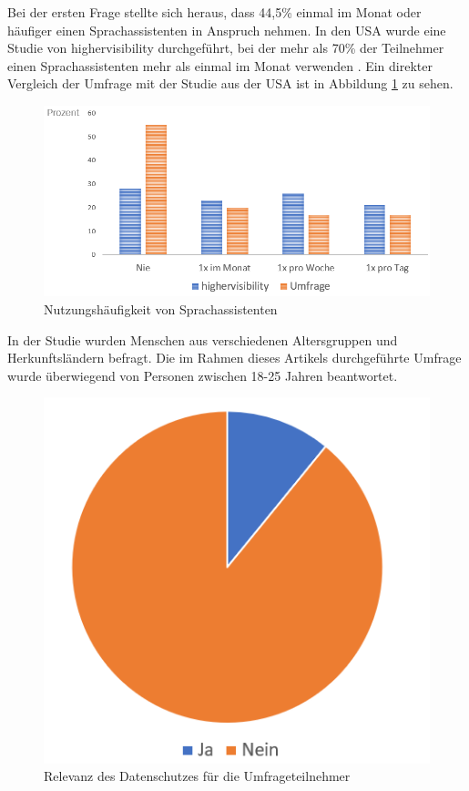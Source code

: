 Bei der ersten Frage stellte sich heraus, dass 44,5\% einmal im Monat oder häufiger einen Sprachassistenten in Anspruch nehmen. In den USA wurde eine Studie von \glqq highervisibility\grqq{} durchgeführt, bei der mehr als 70\% der Teilnehmer einen Sprachassistenten mehr als einmal im Monat verwenden \cite{highervisibility}.
Ein direkter Vergleich der Umfrage mit der Studie aus der USA ist in Abbildung \ref{fig:umfrage_haeufigkeit} zu sehen.

\begin{figure}[!ht]
	\centering
	\includegraphics[width=0.9\linewidth]{Picture/umfrage_haeufigkeit}
	\caption[Nutzungshäufigkeit von Sprachassistenten]{Nutzungshäufigkeit von Sprachassistenten}
	\label{fig:umfrage_haeufigkeit}
\end{figure}

In der Studie wurden Menschen aus verschiedenen Altersgruppen und Herkunftsländern befragt. Die im Rahmen dieses Artikels durchgeführte Umfrage wurde überwiegend von Personen zwischen 18-25 Jahren beantwortet.

\begin{figure}[!ht]
 	\centering
 	\includegraphics[width=0.5\linewidth]{Picture/umfrage_datenschutz}
 	\caption[Relevanz des Datenschutzes für die Umfrageteilnehmer]{Relevanz des Datenschutzes für die Umfrageteilnehmer}
 	\label{fig:umfrage_datenschutz}
\end{figure}

